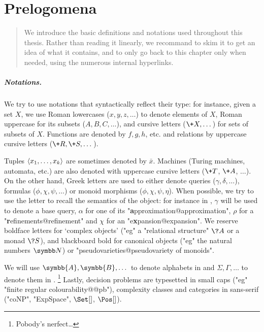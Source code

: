 \chapter{Prelogomena}
\label{ch:general-preliminaries}

\begin{chapterpresentation}
	\begin{abstract}
		We introduce the basic definitions and notations used throughout this thesis.
		Rather than reading it linearly, we recommand to skim it
		to get an idea of what it contains, and to only go back to this chapter
		only when needed, using the numerous internal hyperlinks.
	\end{abstract}
		
	\par\bigskip\bigskip
	\chaptertoc
\end{chapterpresentation}

\paragraph*{Notations.}
We try to use notations that syntactically reflect their type:
for instance, given a set $X$, we use Roman lowercases ($x,y,z,\dotsc$)
to denote elements of $X$, Roman uppercase for its subsets ($A, B, C, \dotsc$),
and cursive letters ($\+X, \dotsc$) for sets of subsets of $X$.
Functions are denoted by $f, g, h$, etc. and relations by
uppercase cursive letters ($\+R, \+S, \dotsc$).

Tuples $\langle x_1,\dotsc,x_k\rangle$ are sometimes denoted by $\bar x$.
Machines (Turing machines, automata, etc.) are also denoted
with uppercase cursive letters ($\+T$, $\+A$, $\dotsc$).
On the other hand, Greek letters are used to either denote queries ($\gamma, \delta, \dotsc$),
formulas ($\phi, \chi, \psi, \dotsc$) or monoid morphisms ($\phi, \chi, \psi, \eta$). When possible, we try to
use the letter to recall the semantics of the object: for instance in
, $\gamma$ will be used to denote a base query,
$\alpha$ for one of its "\textbf{a}pproximation@approximation",
$\rho$ for a "\textbf{r}efinements@refinement" and
$\chi$ for an "e\textbf{x}pansion@expansion".
We reserve boldface letters for `complex objects' ("eg"
a "relational structure" $\?A$ or a monad $\?S$), and blackboard bold
for canonical objects ("eg" the natural numbers $\N$) or "pseudovarieties@pseudovariety of monoids".

We will use $\symbb{A}, \symbb{B}, \dotsc$ to denote
alphabets in  and $\Sigma, \Gamma, \dotsc$
to denote them in .%
\footnote{Pobody's nerfect…}
Lastly, decision problems are typesetted in small caps
("eg" "finite regular colourability@@pb"), 
complexity classes and categories in sans-serif ("coNP", "ExpSpace", $\Set[]$,
$\Pos[]$).


